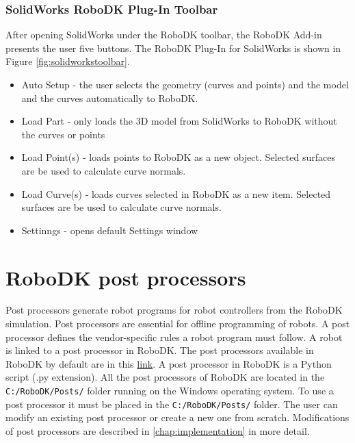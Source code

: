 \subsubsection*{SolidWorks RoboDK Plug-In Toolbar}

After opening SolidWorks under the RoboDK toolbar, the RoboDK Add-in presents the user five buttons. The RoboDK Plug-In for SolidWorks is shown in Figure  \ref{fig:solidworkstoolbar}. 

\begin{itemize}
    \item Auto Setup - the user selects the geometry (curves and points) and the model and the curves automatically to RoboDK.
    \item Load Part - only loads the 3D model from SolidWorks to RoboDK without the curves or points
    \item Load Point(s) - loads points to RoboDK as a new object. Selected surfaces are be used to calculate curve normals. 
    \item Load Curve(s) -  loads curves selected in RoboDK as a new item. Selected surfaces are be used to calculate curve normals. 
    \item Settinngs - opens default Settings window
\end{itemize}

\section{RoboDK post processors}

Post processors generate robot programs for robot controllers from the RoboDK simulation. Post processors are essential for offline programming of robots. A post processor defines the vendor-specific rules a robot program must follow. A robot is linked to a post processor in RoboDK. The post processors available in RoboDK by default are in this \href{https://robodk.com/doc/en/Post-Processors.html#AvailablePosts}{link}.  
A post processor in RoboDK is a Python script (.py extension). All the post processors of RoboDK are located in the
\texttt{C:/RoboDK/Posts/} folder running on the Windows operating system.  To use a post processor it must be placed in the \texttt{C:/RoboDK/Posts/} folder. The user can modify an existing post processor or create a new one from scratch. Modifications of post processors are described in \autoref{chap:implementation} in more detail. 